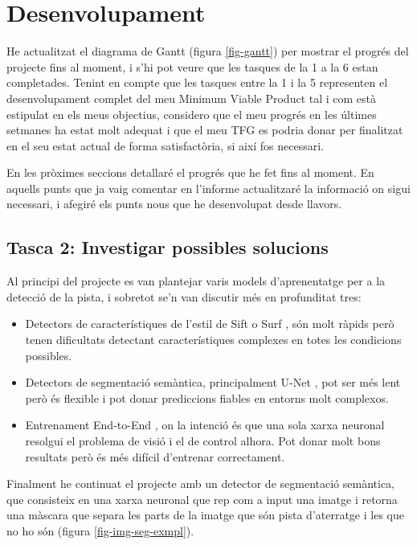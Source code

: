 \documentclass[10pt,a4paper,twocolumn,twoside]{article}
\begin{document}

\section{Desenvolupament}
He actualitzat el diagrama de Gantt (figura \ref{fig-gantt}) per mostrar el progrés del projecte fins al moment, i s'hi pot veure que les tasques
de la 1 a la 6 estan completades. Tenint en compte que les tasques entre la 1 i la 5 representen el desenvolupament complet del meu
Minimum Viable Product tal i com està estipulat en els meus objectius, considero que el meu progrés en les últimes setmanes ha estat
molt adequat i que el meu TFG es podria donar per finalitzat en el seu estat actual de forma satisfactòria, si així fos necessari.

En les pròximes seccions detallaré el progrés que he fet fins al moment. En aquells punts que ja vaig comentar en l'informe actualitzaré
la informació on sigui necessari, i afegiré els punts nous que he desenvolupat desde llavors.
\subsection{Tasca 2: Investigar possibles solucions}
Al principi del projecte es van plantejar varis models d'aprenentatge per a la detecció de la pista, i sobretot se'n van discutir més en profunditat tres:
\begin{itemize}
    \item{Detectors de característiques de l'estil de Sift o Surf \cite{khan2011sift}, són molt ràpids però tenen dificultats detectant característiques complexes en totes les condicions possibles.}
    \item{Detectors de segmentació semàntica, principalment U-Net \cite{ronneberger2015u}, pot ser més lent però és flexible i pot donar prediccions fiables en entorns molt complexos.}
    \item{Entrenament End-to-End \cite{bojarski2016end}, on la intenció és que una sola xarxa neuronal resolgui el problema de visió i el de control alhora. Pot donar molt bons resultats però és més difícil d'entrenar correctament.}
\end{itemize}

Finalment he continuat el projecte amb un detector de segmentació semàntica, que consisteix en una xarxa neuronal que rep com a input una imatge
i retorna una màscara que separa les parts de la imatge que són pista d'aterratge i les que no ho són (figura \ref{fig-img-seg-exmpl}).
\end{document}
